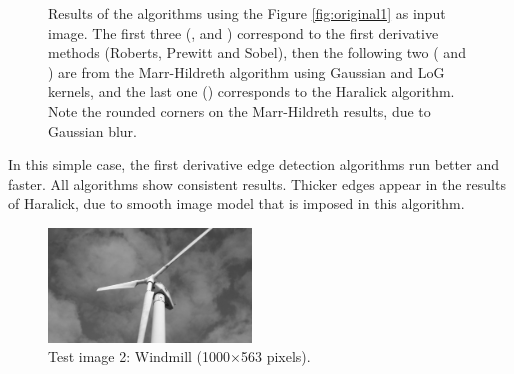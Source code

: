 \documentclass{ipol}
\numberwithin{equation}{section}
\numberwithin{table}{section}
\begin{document}
\begin{figure}[h!]
	\quad
	\quad
	\caption{Results of the algorithms using the Figure \ref{fig:original1} as input image. The first three (,  and ) correspond to the first derivative methods (Roberts, Prewitt and Sobel), then the following two ( and ) are from the Marr-Hildreth algorithm using Gaussian and LoG kernels, and the last one () corresponds to the Haralick algorithm. Note the rounded corners on the Marr-Hildreth results, due to Gaussian blur.}
	\label{fig:result1}
\end{figure}

In this simple case, the first derivative edge detection algorithms run better and faster. All algorithms show consistent results. Thicker edges appear in the results of Haralick, due to smooth image model that is imposed in this algorithm. 

\begin{figure}[t!]
	\centering
	\includegraphics[width=0.48\textwidth]{results/molino_bw.png}
	\caption{Test image 2: Windmill (1000$\times$563 pixels).}
	\label{fig:original2}
\end{figure}
\end{document}
